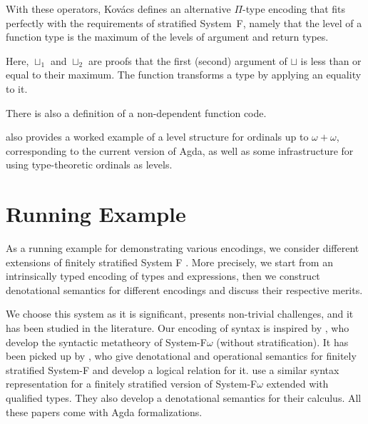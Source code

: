 \documentclass[manuscript,screen,review,anonymous]{acmart}
\begin{document}
\begin{minipage}{0.45\linewidth}
  \ULiftLe
\end{minipage}
\begin{minipage}{0.45\linewidth}
  \UElLiftLe
\end{minipage}

With these operators, Kov\'{a}cs defines an alternative $\Pi$-type encoding that fits perfectly
with the requirements of stratified System~F, namely that the level of
a function type is the maximum of the levels of argument and return types.
\UAltPi

Here, $\sqcup_1$ and $\sqcup_2$ are proofs that the first (second)
argument of $\sqcup$ is less than or equal to their maximum. The
function {\Acoe} transforms a type by applying an equality to it.

There is also a definition of a non-dependent function code.

\UFun

\citet{DBLP:conf/csl/Kovacs22} also provides a worked example of a
level structure for ordinals up to $\omega+\omega$, corresponding to
the current version of Agda, as well as some infrastructure for
using type-theoretic ordinals as levels.

\section{Running Example}
\label{sec:running-example}

As a running example for demonstrating various encodings, we consider
different extensions of finitely stratified System F
\cite{DBLP:journals/iandc/Leivant91}. More precisely, we start from an
intrinsically typed encoding of types and expressions, then we
construct denotational semantics for different encodings and discuss
their respective merits.

We choose this system as it is significant, presents non-trivial
challenges, and it has been studied in the literature. Our encoding of
syntax is inspired by \citet{DBLP:conf/mpc/ChapmanKNW19}, who develop
the syntactic metatheory of System-F$\omega$ (without
stratification). It has been  picked up by
\citet{DBLP:conf/tyde/Saffrich0W24}, who give denotational and operational semantics
for finitely stratified System-F and develop a logical relation for
it. \citet{DBLP:journals/pacmpl/HubersM23} use a similar syntax
representation for a finitely stratified version of System-F$\omega$
extended with qualified types. They also develop a denotational
semantics for their calculus. All these papers come with Agda
formalizations. 
\end{document}
